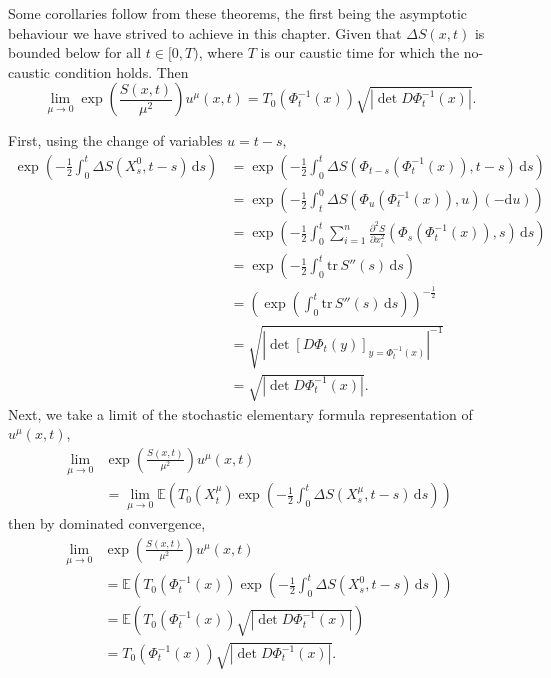 \documentclass[a4paper,12pt,draft]{report}
\theoremstyle{remark}
\theoremstyle{definition}
\begin{document}
Some corollaries follow from these theorems, the first being the asymptotic behaviour we have strived to achieve in this chapter.
\cor
{
Given that $\Delta S(x, t)$ is bounded below for all $t \in [0, T)$, where $T$ is our caustic time for which the no-caustic condition holds.  Then
$$
\lim_{\mu \to 0} \exp\left(\frac{S(x, t)}{\mu^2}\right)u^\mu(x, t) = T_0(\Phi_t^{-1}(x))\sqrt{|\det D\Phi_t^{-1}(x)|}.
$$
}
\proof
{
First, using the change of variables $u = t - s$,
\begin{align}
\exp\left(-\frac{1}{2}\int_0^t \Delta S(X^0_{s}, t - s)\,\mathrm{d}s\right) & = \exp\left(-\frac{1}{2}\int_0^t \Delta S(\Phi_{t - s}(\Phi_t^{-1}(x)), t - s)\,\mathrm{d}s\right)\nonumber\\
& = \exp\left(-\frac{1}{2}\int_t^0 \Delta S(\Phi_u(\Phi_t^{-1}(x)), u) (-\mathrm{d}u)\right)\nonumber\\
& = \exp\left(-\frac{1}{2}\int_0^t \sum_{i = 1}^n\frac{\partial^2 S}{\partial x_i^2}(\Phi_s(\Phi_t^{-1}(x)), s)\,\mathrm{d}s\right)\nonumber\\
& = \exp \left(-\frac{1}{2}\int_0^t \mathrm{tr}\,S''(s)\,\mathrm{d}s\right)\nonumber\\
& = \left(\exp \left(\int_0^t \mathrm{tr}\,S''(s)\,\mathrm{d}s\right)\right)^{-\frac{1}{2}}\nonumber\\
& = \sqrt{|\det \left[D\Phi_t(y)\right]_{y = \Phi_t^{-1}(x)}|^{-1}}\nonumber\\
& = \sqrt{|\det D\Phi_t^{-1}(x)|}.\nonumber
\end{align}
Next, we take a limit of the stochastic elementary formula representation of $u^\mu(x, t)$,
\begin{align}
\lim_{\mu \to 0} & \exp\left(\frac{S(x, t)}{\mu^2}\right)u^\mu(x, t)\nonumber\\
& = \lim_{\mu \to 0}\mathbb{E}\left(T_{0}(X^{\mu}_{t})\exp\left(-\frac{1}{2}\int_0^t \Delta S(X^{\mu}_{s}, t - s)\,\mathrm{d}s\right)\right)\nonumber
\end{align}
then by dominated convergence,
\begin{align}
\lim_{\mu \to 0} & \exp\left(\frac{S(x, t)}{\mu^2}\right)u^\mu(x, t)\nonumber\\
& = \mathbb{E}\left(T_{0}(\Phi_t^{-1}(x))\exp\left(-\frac{1}{2}\int_0^t \Delta S(X^0_{s}, t - s)\,\mathrm{d}s\right)\right)\nonumber\\
& = \mathbb{E}\left(T_{0}(\Phi_t^{-1}(x))\sqrt{|\det D\Phi_t^{-1}(x)|}\right)\nonumber\\
& = T_{0}(\Phi_t^{-1}(x))\sqrt{|\det D\Phi_t^{-1}(x)|}.\nonumber
\end{align}

\qedhere
}
\end{document}
